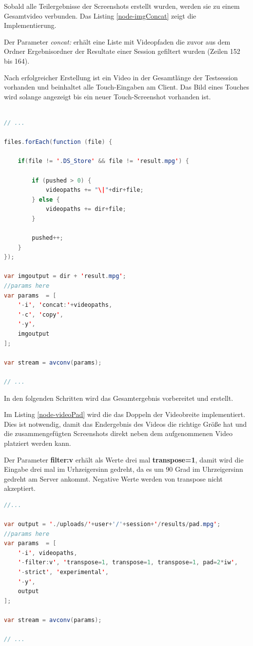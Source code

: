 Sobald alle Teilergebnisse der Screenshots erstellt wurden, werden sie zu einem Gesamtvideo verbunden. Das Listing \ref{node-imgConcat} zeigt die Implementierung. 

Der Parameter \textit{concat:} erhält eine Liste mit Videopfaden die zuvor aus dem Ordner Ergebnisordner der Resultate einer Session gefiltert wurden (Zeilen 152 bis 164). 

Nach erfolgreicher Erstellung ist ein Video in der Gesamtlänge der Testsession vorhanden und beinhaltet alle Touch-Eingaben am Client. Das Bild eines Touches wird solange angezeigt bis ein neuer Touch-Screenshot vorhanden ist. 

\begin{lstlisting}[label=node-imgConcat,language=Java, caption=Screenshot-Videos zu einem Videos konkatenieren, firstnumber=149]

// ...

files.forEach(function (file) {

	if(file != '.DS_Store' && file != 'result.mpg') {

		if (pushed > 0) {
			videopaths += "\|"+dir+file;
		} else {
			videopaths += dir+file;
		}
		
		pushed++;
	}
});

var imgoutput = dir + 'result.mpg';
//params here
var params  = [
	'-i', 'concat:'+videopaths,
	'-c', 'copy',
	'-y',
	imgoutput
];

var stream = avconv(params);

// ...
\end{lstlisting}

In den folgenden Schritten wird das Gesamtergebnis vorbereitet und erstellt. 

Im Listing \ref{node-videoPad} wird die das Doppeln der Videobreite implementiert. Dies ist notwendig, damit das Endergebnis des Videos die richtige Größe hat und die zusammengefügten Screenshots direkt neben dem aufgenommenen Video platziert werden kann. 

Der Parameter \textbf{filter:v} erhält als Werte drei mal \textbf{transpose=1}, damit wird die Eingabe drei mal im Urhzeigersinn gedreht, da es um 90 Grad im Uhrzeigersinn gedreht am Server ankommt. Negative Werte werden von transpose nicht akzeptiert. 

\begin{lstlisting}[label=node-videoPad,language=Java, caption=Erstellung der Ergebnisgrundlage, firstnumber=196]
//...

var output = './uploads/'+user+'/'+session+'/results/pad.mpg';
//params here
var params  = [
	'-i', videopaths,
	'-filter:v', 'transpose=1, transpose=1, transpose=1, pad=2*iw',
	'-strict', 'experimental',
	'-y',
	output
];

var stream = avconv(params);

// ...
\end{lstlisting}

